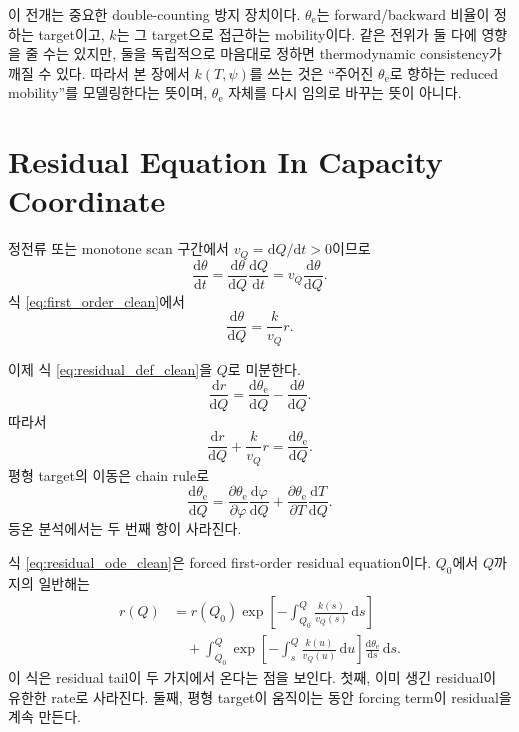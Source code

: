 \documentclass[11pt,a4paper]{article}
\newcommand{\dd}{\mathrm{d}}
\begin{document}
이 전개는 중요한 double-counting 방지 장치이다. \(\theta_{\mathrm e}\)는 forward/backward 비율이 정하는 target이고, \(k\)는 그 target으로 접근하는 mobility이다. 같은 전위가 둘 다에 영향을 줄 수는 있지만, 둘을 독립적으로 마음대로 정하면 thermodynamic consistency가 깨질 수 있다. 따라서 본 장에서 \(k(T,\psi)\)를 쓰는 것은 ``주어진 \(\theta_{\mathrm e}\)로 향하는 reduced mobility''를 모델링한다는 뜻이며, \(\theta_{\mathrm e}\) 자체를 다시 임의로 바꾸는 뜻이 아니다.

\section{Residual Equation In Capacity Coordinate}

정전류 또는 monotone scan 구간에서 \(v_Q=\dd Q/\dd t>0\)이므로
\begin{equation}
\frac{\dd\theta}{\dd t}
=
\frac{\dd\theta}{\dd Q}\frac{\dd Q}{\dd t}
=
v_Q\frac{\dd\theta}{\dd Q}.
\end{equation}
식 \eqref{eq:first_order_clean}에서
\begin{equation}
\frac{\dd\theta}{\dd Q}
=
\frac{k}{v_Q}r .
\label{eq:dtheta_dQ_clean}
\end{equation}

이제 식 \eqref{eq:residual_def_clean}을 \(Q\)로 미분한다.
\begin{equation}
\frac{\dd r}{\dd Q}
=
\frac{\dd\theta_{\mathrm e}}{\dd Q}
-
\frac{\dd\theta}{\dd Q}.
\end{equation}
따라서
\begin{equation}
\boxed{
\frac{\dd r}{\dd Q}
+
\frac{k}{v_Q}r
=
\frac{\dd\theta_{\mathrm e}}{\dd Q}.
}
\label{eq:residual_ode_clean}
\end{equation}
평형 target의 이동은 chain rule로
\begin{equation}
\frac{\dd\theta_{\mathrm e}}{\dd Q}
=
\frac{\partial\theta_{\mathrm e}}{\partial\varphi}
\frac{\dd\varphi}{\dd Q}
+
\frac{\partial\theta_{\mathrm e}}{\partial T}
\frac{\dd T}{\dd Q}.
\label{eq:thetae_chain_clean}
\end{equation}
등온 분석에서는 두 번째 항이 사라진다.

식 \eqref{eq:residual_ode_clean}은 forced first-order residual equation이다. \(Q_0\)에서 \(Q\)까지의 일반해는
\begin{align}
r(Q)
&=
r(Q_0)
\exp\!\left[
-\int_{Q_0}^{Q}\frac{k(s)}{v_Q(s)}\,\dd s
\right]
\nonumber\\
&\quad+
\int_{Q_0}^{Q}
\exp\!\left[
-\int_{s}^{Q}\frac{k(u)}{v_Q(u)}\,\dd u
\right]
\frac{\dd\theta_{\mathrm e}}{\dd s}\,\dd s .
\label{eq:residual_general_clean}
\end{align}
이 식은 residual tail이 두 가지에서 온다는 점을 보인다. 첫째, 이미 생긴 residual이 유한한 rate로 사라진다. 둘째, 평형 target이 움직이는 동안 forcing term이 residual을 계속 만든다.
\end{document}
